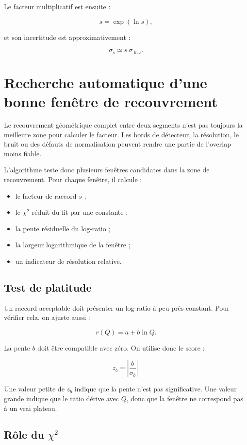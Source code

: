\documentclass[11pt,a4paper]{article}
\begin{document}
Le facteur multiplicatif est ensuite :

\[
    s = \exp(\ln s),
\]

et son incertitude est approximativement :

\[
    \sigma_s \simeq s\,\sigma_{\ln s}.
\]

\section{Recherche automatique d'une bonne fenêtre de recouvrement}

Le recouvrement géométrique complet entre deux segments n'est pas toujours la
meilleure zone pour calculer le facteur. Les bords de détecteur, la résolution,
le bruit ou des défauts de normalisation peuvent rendre une partie de l'overlap
moins fiable.

L'algorithme teste donc plusieurs fenêtres candidates dans la zone de
recouvrement. Pour chaque fenêtre, il calcule :

\begin{itemize}[leftmargin=1.5em]
    \item le facteur de raccord $s$ ;
    \item le $\chi^2$ réduit du fit par une constante ;
    \item la pente résiduelle du log-ratio ;
    \item la largeur logarithmique de la fenêtre ;
    \item un indicateur de résolution relative.
\end{itemize}

\subsection{Test de platitude}

Un raccord acceptable doit présenter un log-ratio à peu près constant.
Pour vérifier cela, on ajuste aussi :

\[
    r(Q) = a + b\ln Q.
\]

La pente $b$ doit être compatible avec zéro. On utilise donc le score :

\[
    z_b = \left|\frac{b}{\sigma_b}\right|.
\]

Une valeur petite de $z_b$ indique que la pente n'est pas significative. Une
valeur grande indique que le ratio dérive avec $Q$, donc que la fenêtre ne
correspond pas à un vrai plateau.

\subsection{Rôle du $\chi^2$}
\end{document}

